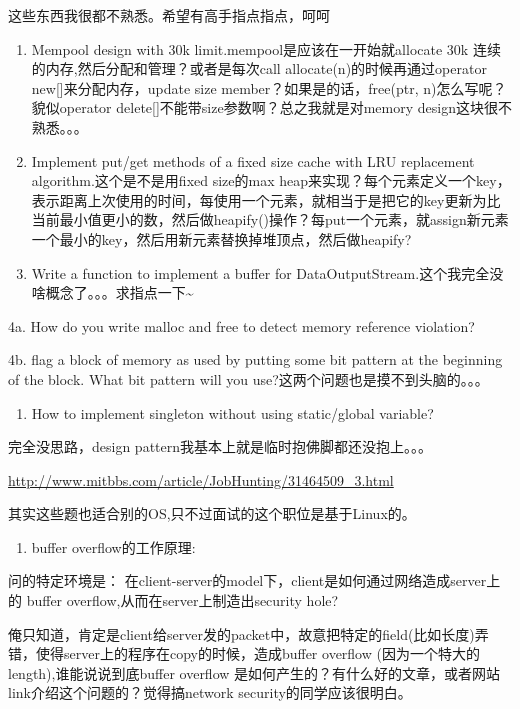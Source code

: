 \documentclass[12pt]{book}
\begin{document}
这些东西我很都不熟悉。希望有高手指点指点，呵呵

\begin{enumerate}
\item Mempool design with 30k limit.mempool是应该在一开始就allocate 30k 连续的内存,然后分配和管理？或者是每次call allocate(n)的时候再通过operator new[]来分配内存，update size member？如果是的话，free(ptr, n)怎么写呢？貌似operator delete[]不能带size参数啊？总之我就是对memory design这块很不熟悉。。。

\item Implement put/get methods of a fixed size cache with LRU replacement algorithm.这个是不是用fixed size的max heap来实现？每个元素定义一个key，表示距离上次使用的时间，每使用一个元素，就相当于是把它的key更新为比当前最小值更小的数，然后做heapify()操作？每put一个元素，就assign新元素一个最小的key，然后用新元素替换掉堆顶点，然后做heapify?

\item Write a function to implement a buffer for DataOutputStream.这个我完全没啥概念了。。。求指点一下\textasciitilde{}
\end{enumerate}

4a. How do you write malloc and free to detect memory reference violation?

4b. flag a block of memory as used by putting some bit pattern at the beginning of the block. What bit pattern will you use?这两个问题也是摸不到头脑的。。。

\begin{enumerate}
\item How to implement singleton without using static/global variable?
\end{enumerate}

完全没思路，design pattern我基本上就是临时抱佛脚都还没抱上。。。

\url{http://www.mitbbs.com/article/JobHunting/31464509_3.html}

其实这些题也适合别的OS,只不过面试的这个职位是基于Linux的。

\begin{enumerate}
\item buffer overflow的工作原理:
\end{enumerate}

问的特定环境是： 在client-server的model下，client是如何通过网络造成server上的 buffer overflow,从而在server上制造出security hole?

俺只知道，肯定是client给server发的packet中，故意把特定的field(比如长度)弄错，使得server上的程序在copy的时候，造成buffer overflow (因为一个特大的length),谁能说说到底buffer overflow 是如何产生的？有什么好的文章，或者网站link介绍这个问题的？觉得搞network security的同学应该很明白。
\end{document}
